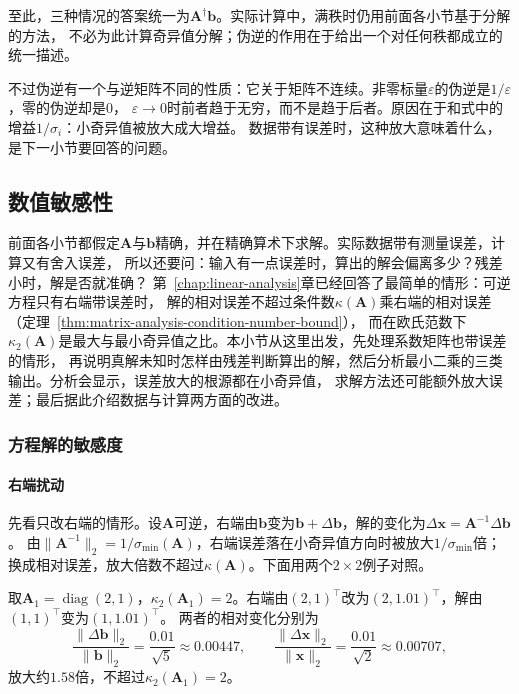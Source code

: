 至此，三种情况的答案统一为$\bm A^\dagger\bm b$。实际计算中，满秩时仍用前面各小节基于分解的方法，
不必为此计算奇异值分解；伪逆的作用在于给出一个对任何秩都成立的统一描述。

不过伪逆有一个与逆矩阵不同的性质：它关于矩阵不连续。非零标量$\varepsilon$的伪逆是$1/\varepsilon$，零的伪逆却是$0$，
$\varepsilon\to0$时前者趋于无穷，而不是趋于后者。原因在于和式中的增益$1/\sigma_i$：小奇异值被放大成大增益。
数据带有误差时，这种放大意味着什么，是下一小节要回答的问题。

\subsection{数值敏感性}
\label{sec:ls-numerical-sensitivity}

前面各小节都假定$\bm A$与$\bm b$精确，并在精确算术下求解。实际数据带有测量误差，计算又有舍入误差，
所以还要问：输入有一点误差时，算出的解会偏离多少？残差小时，解是否就准确？
第~\ref{chap:linear-analysis}章已经回答了最简单的情形：可逆方程只有右端带误差时，
解的相对误差不超过条件数$\kappa(\bm A)$乘右端的相对误差（定理~\ref{thm:matrix-analysis-condition-number-bound}），
而在欧氏范数下$\kappa_2(\bm A)$是最大与最小奇异值之比。本小节从这里出发，先处理系数矩阵也带误差的情形，
再说明真解未知时怎样由残差判断算出的解，然后分析最小二乘的三类输出。分析会显示，误差放大的根源都在小奇异值，
求解方法还可能额外放大误差；最后据此介绍数据与计算两方面的改进。

\subsubsection{方程解的敏感度}
\label{sec:ls-equation-sensitivity}
\label{sec:ls-linear-system-sensitivity}

\paragraph{右端扰动}

先看只改右端的情形。设$\bm A$可逆，右端由$\bm b$变为$\bm b+\Delta\bm b$，解的变化为$\Delta\bm x=\bm A^{-1}\Delta\bm b$。
由$\lVert\bm A^{-1}\rVert_2=1/\sigma_{\min}(\bm A)$，右端误差落在小奇异值方向时被放大$1/\sigma_{\min}$倍；
换成相对误差，放大倍数不超过$\kappa(\bm A)$。下面用两个$2\times2$例子对照。

\begin{example}[良态方程的右端扰动]
\label{ex:ls-rhs-perturbation-well-conditioned}
取$\bm A_1=\operatorname{diag}(2,1)$，$\kappa_2(\bm A_1)=2$。右端由$(2,1)^\top$改为$(2,1.01)^\top$，解由$(1,1)^\top$变为$(1,1.01)^\top$。
两者的相对变化分别为
\[
 \frac{\lVert\Delta\bm b\rVert_2}{\lVert\bm b\rVert_2}=\frac{0.01}{\sqrt5}\approx0.00447,\qquad
 \frac{\lVert\Delta\bm x\rVert_2}{\lVert\bm x\rVert_2}=\frac{0.01}{\sqrt2}\approx0.00707,
\]
放大约$1.58$倍，不超过$\kappa_2(\bm A_1)=2$。
\end{example}

